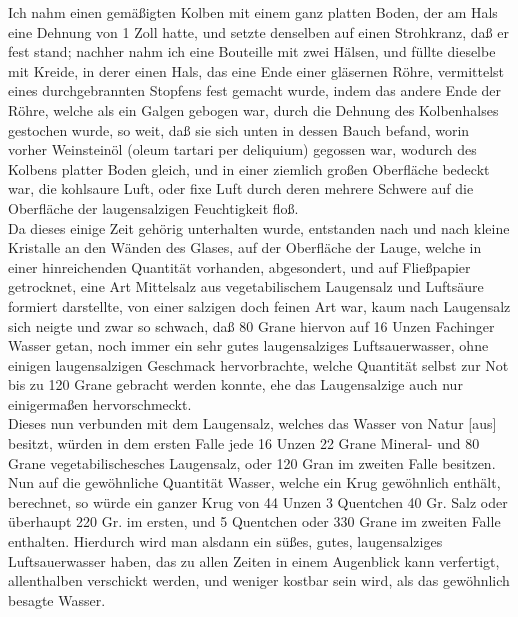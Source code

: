 \documentclass[11pt,a5paper,twoside]{memoir}
\begin{document}
Ich nahm einen gemäßigten Kolben mit einem ganz platten Boden,
der am Hals eine Dehnung von 1 Zoll hatte,
und setzte denselben auf einen Strohkranz,
daß er fest stand;
nachher nahm ich eine Bouteille mit zwei Hälsen,
und füllte dieselbe mit Kreide,
in derer einen Hals, das eine Ende einer gläsernen Röhre,
vermittelst eines durchgebrannten Stopfens fest gemacht wurde,
indem das andere Ende der Röhre,
welche als ein Galgen gebogen war,
durch die Dehnung des Kolbenhalses gestochen wurde,
so weit, daß sie sich unten in dessen Bauch befand,
worin vorher Weinsteinöl%
({\lattext oleum tartari per deliquium})
gegossen war,
wodurch des Kolbens platter Boden gleich,
und in einer ziemlich großen Oberfläche bedeckt war,
die kohlsaure Luft, oder fixe Luft
durch deren mehrere Schwere auf die Oberfläche
der laugensalzigen Feuchtigkeit floß.\\

Da dieses einige Zeit gehörig unterhalten wurde,
entstanden nach und nach kleine Kristalle an den Wänden des Glases,
auf der Oberfläche der Lauge,
welche in einer hinreichenden Quantität vorhanden,
abgesondert, und auf Fließpapier getrocknet,
eine Art Mittelsalz aus vegetabilischem Laugensalz
und Luftsäure formiert darstellte,
von einer salzigen doch feinen Art war,
kaum nach Laugensalz sich neigte%
und zwar so schwach,
daß 80 Grane hiervon auf 16 Unzen Fachinger Wasser getan,
noch immer ein sehr gutes laugensalziges Luftsauerwasser,
ohne einigen laugensalzigen Geschmack hervorbrachte,
welche Quantität selbst zur Not bis zu 120 Grane gebracht werden konnte,
ehe das Laugensalzige auch nur einigermaßen hervorschmeckt.\\

Dieses nun verbunden mit dem Laugensalz,
welches das Wasser von Natur [aus] besitzt,
würden in dem ersten Falle jede 16 Unzen
22 Grane Mineral-
und 80 Grane vegetabilischesches Laugensalz,
oder 120 Gran im zweiten Falle besitzen.
Nun auf die gewöhnliche Quantität Wasser,
welche ein Krug gewöhnlich enthält, berechnet,
so würde ein ganzer Krug von 44 Unzen
3 Quentchen 40 Gr. Salz
oder überhaupt 220 Gr. im ersten,
und 5 Quentchen
oder 330 Grane im zweiten Falle enthalten.
\label{units_value_page}
Hierdurch wird man alsdann ein süßes, gutes,
laugensalziges Luftsauerwasser haben,
das zu allen Zeiten in einem Augenblick kann verfertigt,
allenthalben verschickt werden,
und weniger kostbar
sein wird,
als das gewöhnlich besagte Wasser.\\
\end{document}
